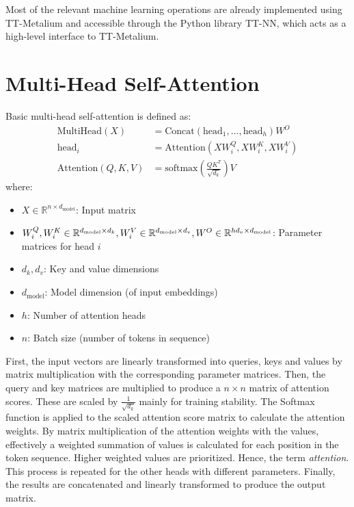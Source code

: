 \documentclass[conference]{IEEEtran}
\begin{document}
Most of the relevant machine learning operations are already implemented using TT-Metalium and accessible through the Python library TT-NN, which acts as a high-level interface to TT-Metalium.

\section{Multi-Head Self-Attention}
Basic multi-head self-attention \cite{vaswani2017} is defined as:
\begin{align*}
\text{MultiHead}(X) &= \text{Concat}(\text{head}_1, \ldots, \text{head}_h) W^O \\
\text{head}_i &= \text{Attention}(X W_i^Q, X W_i^K, X W_i^V) \\
\text{Attention}(Q, K, V) &= \text{softmax}\left(\frac{Q K^T}{\sqrt{d_k}}\right) V
\end{align*}
where:
\begin{itemize}
    \item \( X \in \mathbb{R}^{n \times d_{\text{model}}} \): Input matrix
    \item \( W_i^Q, W_i^K \in \mathbb{R}^{d_{\text{model}} \times d_k}, W_i^V \in \mathbb{R}^{d_{\text{model}} \times d_v}, \\ W^O \in \mathbb{R}^{h d_v \times d_{\text{model}}} \): Parameter matrices for head \(i\)
    \item \( d_k, d_v \): Key and value dimensions
    \item \( d_{\text{model}} \): Model dimension (of input embeddings)
    \item \( h \): Number of attention heads
    \item \( n \): Batch size (number of tokens in sequence)
\end{itemize}

First, the input vectors are linearly transformed into queries, keys and values by matrix multiplication with the corresponding parameter matrices. Then, the query and key matrices are multiplied to produce a \(n \times n\) matrix of attention scores.  These are scaled by $\frac{1}{\sqrt{d_k}}$ mainly for training stability. The Softmax function is applied to the scaled attention score matrix to calculate the attention weights. By matrix multiplication of the attention weights with the values, effectively a weighted summation of values is calculated for each position in the token sequence. Higher weighted values are prioritized. Hence, the term \textit{attention}. This process is repeated for the other heads with different parameters. Finally, the results are concatenated and linearly transformed to produce the output matrix.
\end{document}
